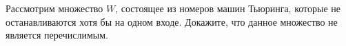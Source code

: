 Рассмотрим множество $W$, состоящее из номеров машин Тьюринга, которые не останавливаются хотя бы на одном входе. Докажите, что
данное множество не является перечислимым.